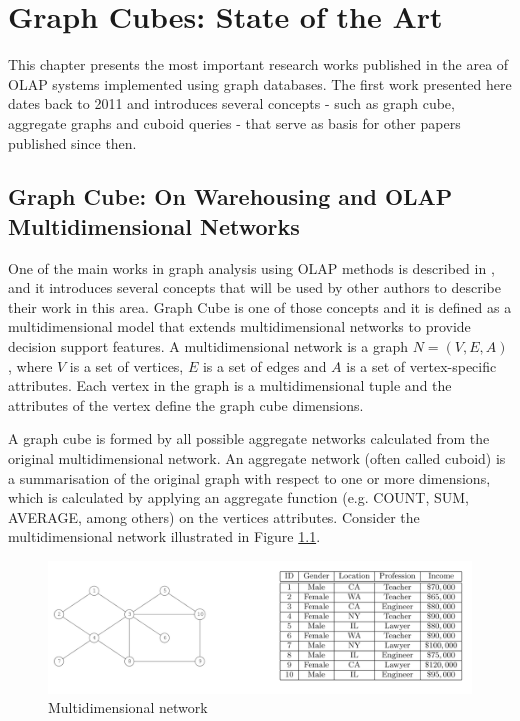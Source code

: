 \chapter{Graph Cubes: State of the Art}

This chapter presents the most important research works published in the area of OLAP systems implemented using graph databases. The first work presented here dates back to 2011 and introduces several concepts - such as graph cube, aggregate graphs and cuboid queries - that serve as basis for other papers published since then.

\section{Graph Cube: On Warehousing and OLAP Multidimensional Networks}

One of the main works in graph analysis using OLAP methods is described in \cite{Zhao2011}, and it  introduces several concepts that will be used by other authors to describe their work in this area. Graph Cube is one of those concepts and it is defined as a multidimensional model that extends multidimensional networks to provide decision support features. A multidimensional network is a graph $N=(V,E,A)$, where $V$ is a set of vertices, $E$ is a set of edges and $A$ is a set of vertex-specific attributes. Each vertex in the graph is a multidimensional tuple and the attributes of the vertex define the graph cube dimensions.
 
A graph cube is formed by all possible aggregate networks calculated from the original multidimensional network. An aggregate network (often called cuboid) is a summarisation of the original graph with respect to one or more dimensions, which is calculated by applying an aggregate function (e.g. COUNT, SUM, AVERAGE, among others) on the vertices attributes. Consider the multidimensional network illustrated in Figure \ref{fig:figure12}.

\begin{figure}[ht]
\centering
\includegraphics[width=1\textwidth]{../multidimensional_graph.png}
\caption{Multidimensional network \cite{Zhao2011}}
\label{fig:figure12}
\end{figure}

